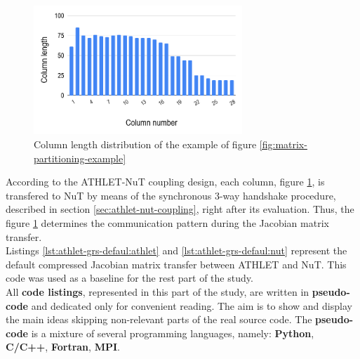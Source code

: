 \begin{figure}[htpb]
  \centering
  \includegraphics[width=0.7\textwidth]{figures/matrix-compression-2.png}
  \caption{Column length distribution of the example of figure \ref{fig:matrix-partitioning-example}} \label{fig:matrix-column-distribution}
\end{figure}


According to the ATHLET-NuT coupling design, each column, figure \ref{fig:matrix-column-distribution}, is transfered to NuT by means of the synchronous 3-way handshake procedure, described in section \ref{sec:athlet-nut-coupling}, right after its evaluation. Thus, the figure \ref{fig:matrix-column-distribution} determines the communication pattern during the Jacobian matrix transfer.\\


Listings \ref{lst:athlet-grs-defaul:athlet} and \ref{lst:athlet-grs-defaul:nut} represent the default compressed Jacobian matrix transfer between ATHLET and NuT. This code was used as a baseline for the rest part of the study.\\


All \textbf{code listings}, represented in this part of the study, are written in \textbf{pseudo-code} and dedicated only for convenient reading. The aim is to show and display the main ideas skipping non-relevant parts of the real source code. The \textbf{pseudo-code} is a mixture of several programming languages, namely: \textbf{Python}, \textbf{C/C++}, \textbf{Fortran}, \textbf{MPI}.\\


